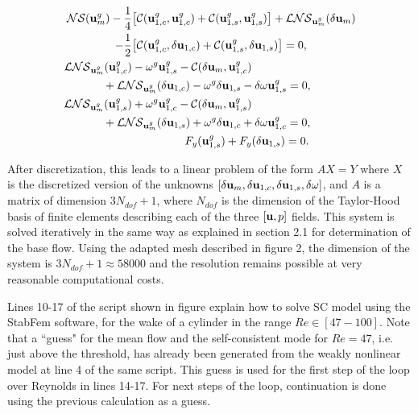 \documentclass[twocolumn,10pt]{asme2ej}
\begin{document}
\begin{subequations}

\begin{align}
{\cal NS}(  {\bf u }_m^g ) - \frac{1}{4} &\big[ {\cal C}( {\bf u }_{1,c}^g,{\bf u }_{1,c}^g) +  {\cal C}( {\bf u }_{1,s}^g,{\bf u }_{1,s}^g) \big]+ {\cal LNS}_{{\bf u }_m^g}(\delta {\bf u }_m) \nonumber \\
-\frac{1}{2}& \big[ {\cal C}( {\bf u }_{1,c}^g,\delta {\bf u }_{1,c}) +  {\cal C}( {\bf u }_{1,s}^g,\delta {\bf u }_{1,s}) \big] = 0, \label{HB_1} \\
{\cal LNS}_{{\bf u }_m^g}( {\bf u }_{1,c}^g)& - \omega^g {\bf u }_{1,s}^g -  {\cal C}( \delta {\bf u }_{m}, {\bf u }_{1,c}^g) \nonumber \\
&\hspace{-0.9cm}+{\cal LNS}_{{\bf u }_m^g}( \delta {\bf u }_{1,c})  - \omega^g \delta {\bf u }_{1,s}  
 - \delta \omega {\bf u }_{1,s}^g = 0 , \label{HB_2}\\
{\cal LNS}_{{\bf u }_m^g}({\bf u }_{1,s}^g)& + \omega^g {\bf u }_{1,c}^g -  {\cal C}( \delta {\bf u }_{m}, {\bf u }_{1,s}^g) \nonumber \\
&\hspace{-0.9cm}+{\cal LNS}_{{\bf u }_m^g}( \delta {\bf u }_{1,s}) + \omega^g \delta {\bf u }_{1,c} +  \delta \omega {\bf u }_{1,c}^g= 0 , \label{HB_3} \\
&\hspace{1.65cm} F_y({\bf u }_{1,s}^g) + F_y(\delta {\bf u }_{1,s}) = 0. 
\end{align}
\end{subequations}

After discretization, this leads to a linear problem of the form $A X = Y$ where $X$ is the discretized version of the unknowns  $[\delta {\bf u }_m, \delta {\bf u }_{1,c}, \delta {\bf u }_{1,s}, \delta \omega]$, and $A$ is a matrix of dimension $3 N_{dof} +1$, where $N_{dof}$ is the dimension of the Taylor-Hood basis of finite elements describing each of the three $[{\bf u},p]$ fields.    This system is solved iteratively in the same way as explained in section 2.1 for determination of the base flow. Using the adapted mesh described in figure 2, the dimension of the system 
is $3 N_{dof} +1 \approx 58 000$ and the resolution remains possible at very reasonable computational costs. 

Lines 10-17 of the script shown in figure \label{fig:listingNL}  explain how to solve SC model using the StabFem software, 
for the wake of a cylinder in the range $Re \in [47-100] $. Note that a ``guess" for the mean flow and the self-consistent mode for $Re = 47$, i.e. just above the threshold, has already been generated from the weakly nonlinear model at line 4 of the same script. This guess is used for the first step of the loop over Reynolds in lines 14-17. For next steps of the loop, continuation is done using the previous calculation as a guess. 
\end{document}
